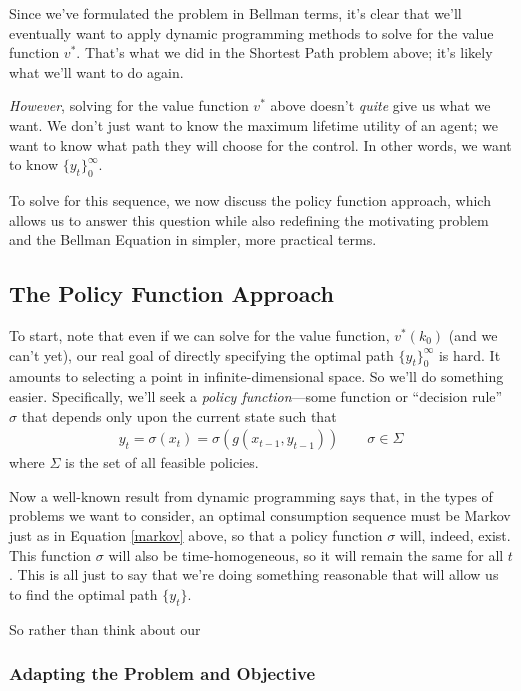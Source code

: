 \documentclass[a4paper,12pt]{scrartcl}
\begin{document}
Since we've formulated the problem in Bellman terms, it's
clear that we'll eventually want to apply dynamic
programming methods to solve for the value function $v^*$.
That's what we did in the Shortest Path problem above; it's
likely what we'll want to do again.  


\emph{However}, solving for the value function $v^*$ above
doesn't \emph{quite} give us what we want. We don't just
want to know the maximum lifetime utility of an agent; we
want to know what path they will choose for the control.
In other words, we want to know $\{y_t\}_0^\infty$. 

To solve for this sequence, we now discuss the policy function approach,
which allows us to answer this question while also redefining the
motivating problem and the Bellman Equation in simpler, more practical
terms. 


\subsection{The Policy Function Approach}

To start, note that even if we can solve for the value function,
$v^*(k_0)$ (and we can't yet), our real goal of directly specifying the
optimal path $\{y_t\}_0^\infty$ is hard. It amounts to selecting a point
in infinite-dimensional space.  So we'll do something easier.
Specifically, we'll seek a \emph{policy function}---some function or
``decision rule'' $\sigma$ that depends only upon the current state such
that 
\begin{align}
  \label{markov}
  y_t = \sigma(x_t) = \sigma(g(x_{t-1}, y_{t-1}))
  \qquad \sigma \in \Sigma
\end{align}
where $\Sigma$ is the set of all feasible policies. 

Now a well-known result from dynamic programming says that, in the types
of problems we want to consider, an optimal consumption sequence must be
Markov just as in Equation \ref{markov} above, so that a policy function
$\sigma$ will, indeed, exist.  This function $\sigma$ will also be
time-homogeneous, so it will remain the same for all $t$.  This is all
just to say that we're doing something reasonable that will allow us to
find the optimal path $\{y_t\}$.

So rather than think about our 

\subsubsection{Adapting the Problem and Objective}
\end{document}
